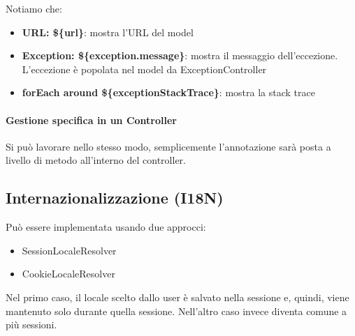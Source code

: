 \documentclass[11pt,a4paper]{book}
\begin{document}
Notiamo che:
\begin{itemize}
	\item \textbf{URL: \$\{url\}}: mostra l'URL del model
	\item \textbf{Exception: \$\{exception.message\}}: mostra il messaggio dell'eccezione. L'eccezione è popolata nel model da ExceptionController
	\item \textbf{forEach around \$\{exceptionStackTrace\}}: mostra la stack trace
\end{itemize}

\paragraph{Gestione specifica in un Controller}
Si può lavorare nello stesso modo, semplicemente l'annotazione sarà posta a livello di metodo all'interno del controller.

\subsection{Internazionalizzazione (I18N)}
Può essere implementata usando due approcci:
\begin{itemize}
	\item SessionLocaleResolver
	\item CookieLocaleResolver
\end{itemize}
Nel primo caso, il locale scelto dallo user è salvato nella sessione e, quindi, viene mantenuto solo durante quella sessione. Nell'altro caso invece diventa comune a più sessioni.
\end{document}
